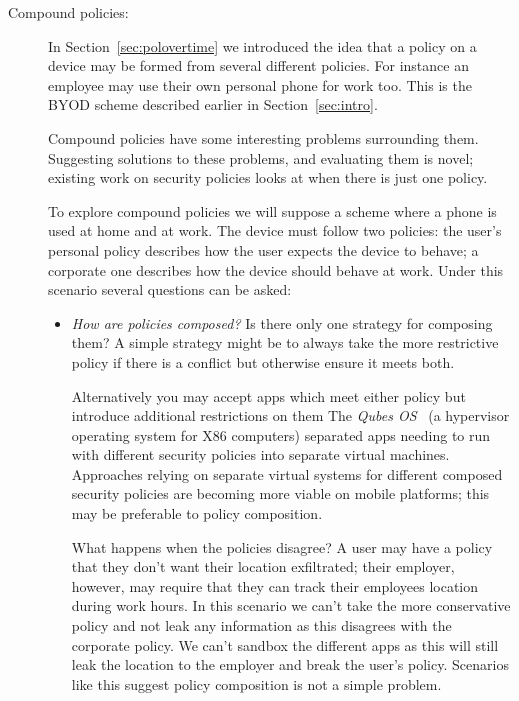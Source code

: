 \documentclass[a4paper]{article}
\begin{document}
\begin{description}
  \item[Compound policies:] In Section~\ref{sec:polovertime} we introduced the idea that a policy on a
    device may be formed from several different policies.  For instance an
    employee may use their own personal phone for work too.  This is the
    \ac{BYOD} scheme described earlier in Section~\ref{sec:intro}.
    
    Compound policies have some interesting problems surrounding them.
    Suggesting solutions to these problems, and evaluating them is novel;
    existing work on security policies looks at when there is just one policy.

    To explore compound policies we will suppose a scheme where a phone is used
    at home and at work.  The device must follow two policies: the user's
    personal policy describes how the user expects the device to behave; a
    corporate one describes how the device should behave at work.  Under this
    scenario several questions can be asked:

    \begin{itemize}
    
      \item \emph{How are policies composed?}  Is there only one strategy for
        composing them?  A simple strategy might be to always take the more
        restrictive policy if there is a conflict but otherwise ensure it meets
        both.  
        
        Alternatively you may accept apps which meet either policy but
        introduce additional restrictions on them
        The \emph{Qubes OS}~\cite{Rutkowska:2010wr} (a hypervisor
        operating system for X86 computers) separated apps needing to run with
        different security policies into separate virtual machines.  Approaches
        relying on separate virtual systems for different composed security
        policies are becoming more viable on mobile platforms; this may be
        preferable to policy composition.

        What happens when the policies disagree?  A user may have a policy that
        they don't want their location exfiltrated; their employer, however, may
        require that they can track their employees location during work hours.  
        In this scenario we can't take the more conservative policy and not leak
        any information as this disagrees with the corporate policy.  We can't
        sandbox the different apps as this will still leak the location to the
        employer and break the user's policy.  Scenarios like this suggest
        policy composition is not a simple problem.


\end{itemize}
\end{description}
\end{document}
